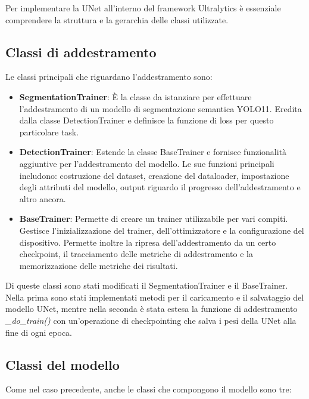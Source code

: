 \documentclass[12pt]{report}
\begin{document}
Per implementare la UNet all'interno del framework Ultralytics è essenziale comprendere la struttura e la gerarchia delle classi utilizzate.

\subsection{Classi di addestramento}
\label{sec:classi_per_addestramento}

Le classi principali che riguardano l'addestramento sono:

\begin{itemize}
	\item \textbf{SegmentationTrainer}: È la classe da istanziare per effettuare l'addestramento di un modello di segmentazione semantica YOLO11. Eredita dalla classe DetectionTrainer e definisce la funzione di loss per questo particolare task.
	
	\item \textbf{DetectionTrainer}: Estende la classe BaseTrainer e fornisce funzionalità aggiuntive per l'addestramento del modello. Le sue funzioni principali includono: costruzione del dataset, creazione del dataloader, impostazione degli attributi del modello, output riguardo il progresso dell'addestramento e altro ancora.
	
	\item \textbf{BaseTrainer}: Permette di creare un trainer utilizzabile per vari compiti. Gestisce l'inizializzazione del trainer, dell'ottimizzatore e la configurazione del dispositivo. Permette inoltre la ripresa dell'addestramento da un certo checkpoint, il tracciamento delle metriche di addestramento e la memorizzazione delle metriche dei risultati.
\end{itemize}

Di queste classi sono stati modificati il SegmentationTrainer e il BaseTrainer. Nella prima sono stati implementati metodi per il caricamento e il salvataggio del modello UNet, mentre nella seconda è stata estesa la funzione di addestramento \textit{\_do\_train()} con un'operazione di checkpointing che salva i pesi della UNet alla fine di ogni epoca.

\subsection{Classi del modello}
\label{sec:classi_del_modello}

Come nel caso precedente, anche le classi che compongono il modello sono tre:
\end{document}
